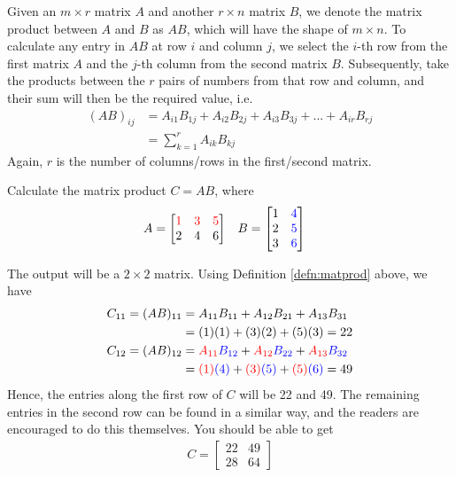 \begin{defn}
\label{defn:matprod}
Given an $m \times r$ matrix $A$ and another $r \times n$ matrix $B$, we denote the matrix product between $A$ and $B$ as $AB$, which will have the shape of $m \times n$. To calculate any entry in $AB$ at row $i$ and column $j$, we select the $i$-th row from the first matrix $A$ and the $j$-th column from the second matrix $B$. Subsequently, take the products between the $r$ pairs of numbers from that row and column, and their sum will then be the required value, i.e.\
\begin{subequations}
\begin{align}
(AB)_{ij} &= A_{i1}B_{1j} + A_{i2}B_{2j} + A_{i3}B_{3j} + ... + A_{ir}B_{rj} \\
&= \sum_{k=1}^{r} A_{ik}B_{kj}
\end{align}    
\end{subequations}
Again, $r$ is the number of columns/rows in the first/second matrix.
\end{defn}
\begin{exmp}
Calculate the matrix product $C = AB$, where
\begin{align*}
& A = 
\begin{bmatrix}
\mathcolor{red}{1} & \mathcolor{red}{3} & \mathcolor{red}{5} \\
2 & 4 & 6 
\end{bmatrix} &
& B = 
\begin{bmatrix}
1 & \mathcolor{blue}{4} \\
2 & \mathcolor{blue}{5} \\
3 & \mathcolor{blue}{6}
\end{bmatrix}
\end{align*}
\end{exmp}
\begin{solution}
The output will be a $2 \times 2$ matrix. Using Definition \ref{defn:matprod} above, we have
\begin{align*}
C_{11} = (AB)_{11} &= A_{11}B_{11} + A_{12}B_{21} + A_{13}B_{31} \\
&= (1)(1) + (3)(2) + (5)(3) = 22 \\
C_{12} = (AB)_{12} &= \textcolor{red}{A_{11}}\textcolor{blue}{B_{12}} + \textcolor{red}{A_{12}}\textcolor{blue}{B_{22}} + \textcolor{red}{A_{13}}\textcolor{blue}{B_{32}} \\
&= \textcolor{red}{(1)}\textcolor{blue}{(4)} + \textcolor{red}{(3)}\textcolor{blue}{(5)} + \textcolor{red}{(5)}\textcolor{blue}{(6)} = 49
\end{align*}
Hence, the entries along the first row of $C$ will be 22 and 49. The remaining entries in the second row can be found in a similar way, and the readers are encouraged to do this themselves. You should be able to get
\begin{align*}
C = 
\begin{bmatrix}
22 & 49 \\
28 & 64
\end{bmatrix}   
\end{align*}
\end{solution}

